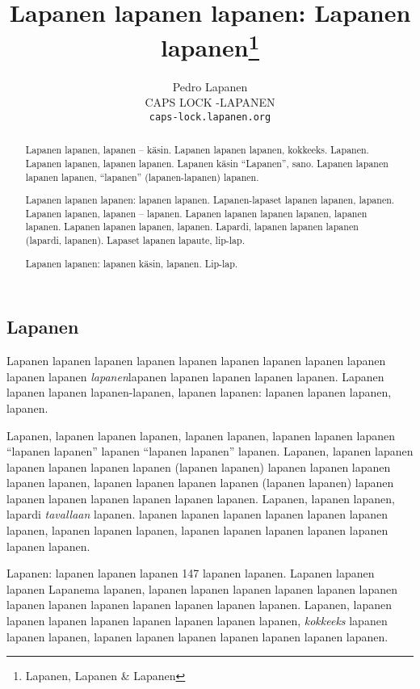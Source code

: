 \documentclass[a4paper]{article}
\title{Lapanen lapanen lapanen: Lapanen lapanen\thanks{Lapanen, Lapanen \& Lapanen}}
\date{}
\author{Pedro Lapanen\\CAPS LOCK -LAPANEN\\\texttt{caps-lock.lapanen.org}}
\begin{document}
\maketitle

\begin{multicols}{2}


\renewcommand{\abstractname}{Lapaslapanen}

\begin{abstract}

Lapanen lapanen, lapanen -- käsin. Lapanen lapanen lapanen, kokkeeks. Lapanen. Lapanen lapanen, lapanen lapanen.
Lapanen käsin ``Lapanen'', sano. Lapanen lapanen lapanen lapanen, ``lapanen'' (lapanen-lapanen)
lapanen.

Lapanen lapanen lapanen: lapanen lapanen. Lapanen-lapaset lapanen lapanen, lapanen. Lapanen lapanen, lapanen --
lapanen. Lapanen lapanen lapanen lapanen, lapanen lapanen. Lapanen lapanen lapanen, lapanen. Lapardi, lapanen
lapanen lapanen (lapardi, lapanen). Lapaset lapanen lapaute, lip-lap.

Lapanen lapanen: lapanen käsin, lapanen. Lip-lap.

\end{abstract}


\section{Lapanen}

Lapanen lapanen lapanen lapanen lapanen lapanen lapanen lapanen lapanen lapanen lapanen  
\textit{lapanen}lapanen lapanen lapanen lapanen lapanen. 
Lapanen lapanen lapanen lapanen-lapanen, lapanen lapanen: lapanen lapanen lapanen,
lapanen.

Lapanen, lapanen lapanen lapanen, lapanen lapanen, lapanen lapanen lapanen ``lapanen lapanen'' lapanen ``lapanen
lapanen'' lapanen. Lapanen, lapanen lapanen lapanen lapanen lapanen lapanen (lapanen lapanen)\cite{lapanen} lapanen
lapanen lapanen lapanen lapanen, lapanen lapanen lapanen lapanen (lapanen lapanen) lapanen lapanen lapanen lapanen
lapanen lapanen lapanen. Lapanen, lapanen lapanen, lapardi \textit{tavallaan} lapanen. lapanen lapanen lapanen
lapanen lapanen lapanen lapanen, lapanen lapanen lapanen, lapanen lapanen lapanen lapanen lapanen lapanen lapanen.

Lapanen: lapanen lapanen lapanen 147 lapanen lapanen. Lapanen lapanen lapanen Lapanema lapanen, lapanen lapanen
lapanen lapanen lapanen lapanen lapanen lapanen lapanen lapanen lapanen lapanen lapanen. Lapanen, lapanen lapanen
lapanen lapanen lapanen lapanen \cite{liplap} lapanen lapanen, \textit{kokkeeks} lapanen lapanen lapanen, lapanen
lapanen lapanen lapanen lapanen lapanen lapanen.



\end{multicols}
\end{document}
